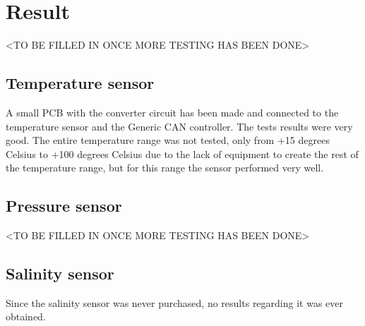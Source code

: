 
\section{Result}\label{sec:result}
<TO BE FILLED IN ONCE MORE TESTING HAS BEEN DONE>

\subsection{Temperature sensor}
A small PCB with the converter circuit has been made and connected to the temperature sensor and the Generic CAN controller. The tests results were very good. The entire temperature range was not tested, only from +15 degrees Celsius to +100 degrees Celsius due to the lack of equipment to create the rest of the temperature range, but for this range the sensor performed very well. 

\subsection{Pressure sensor}
<TO BE FILLED IN ONCE MORE TESTING HAS BEEN DONE>

\subsection{Salinity sensor}
Since the salinity sensor was never purchased, no results regarding it was ever obtained.

